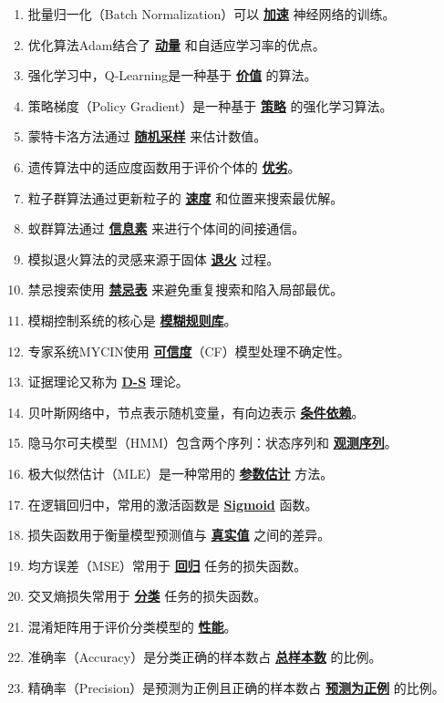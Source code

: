 \documentclass[12pt,a4paper,openany]{ctexbook}
\begin{document}
\begin{enumerate}[leftmargin=2em,itemsep=1pt]
\item 批量归一化（Batch Normalization）可以 \underline{\textbf{加速}} 神经网络的训练。
\item 优化算法Adam结合了 \underline{\textbf{动量}} 和自适应学习率的优点。
\item 强化学习中，Q-Learning是一种基于 \underline{\textbf{价值}} 的算法。
\item 策略梯度（Policy Gradient）是一种基于 \underline{\textbf{策略}} 的强化学习算法。
\item 蒙特卡洛方法通过 \underline{\textbf{随机采样}} 来估计数值。
\item 遗传算法中的适应度函数用于评价个体的 \underline{\textbf{优劣}}。
\item 粒子群算法通过更新粒子的 \underline{\textbf{速度}} 和位置来搜索最优解。
\item 蚁群算法通过 \underline{\textbf{信息素}} 来进行个体间的间接通信。
\item 模拟退火算法的灵感来源于固体 \underline{\textbf{退火}} 过程。
\item 禁忌搜索使用 \underline{\textbf{禁忌表}} 来避免重复搜索和陷入局部最优。
\item 模糊控制系统的核心是 \underline{\textbf{模糊规则库}}。
\item 专家系统MYCIN使用 \underline{\textbf{可信度}}（CF）模型处理不确定性。
\item 证据理论又称为 \underline{\textbf{D-S}} 理论。
\item 贝叶斯网络中，节点表示随机变量，有向边表示 \underline{\textbf{条件依赖}}。
\item 隐马尔可夫模型（HMM）包含两个序列：状态序列和 \underline{\textbf{观测序列}}。
\item 极大似然估计（MLE）是一种常用的 \underline{\textbf{参数估计}} 方法。
\item 在逻辑回归中，常用的激活函数是 \underline{\textbf{Sigmoid}} 函数。
\item 损失函数用于衡量模型预测值与 \underline{\textbf{真实值}} 之间的差异。
\item 均方误差（MSE）常用于 \underline{\textbf{回归}} 任务的损失函数。
\item 交叉熵损失常用于 \underline{\textbf{分类}} 任务的损失函数。
\item 混淆矩阵用于评价分类模型的 \underline{\textbf{性能}}。
\item 准确率（Accuracy）是分类正确的样本数占 \underline{\textbf{总样本数}} 的比例。
\item 精确率（Precision）是预测为正例且正确的样本数占 \underline{\textbf{预测为正例}} 的比例。

\end{enumerate}
\end{document}
